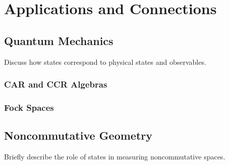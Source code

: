 \section{Applications and Connections}
\subsection{Quantum Mechanics}
Discuss how states correspond to physical states and observables.

\subsubsection{CAR and CCR Algebras}

\subsubsection{Fock Spaces}

\subsection{Noncommutative Geometry}
Briefly describe the role of states in measuring noncommutative spaces.